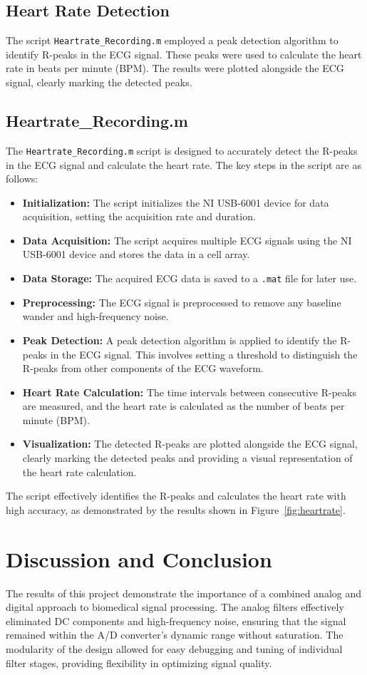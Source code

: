 \documentclass[11pt]{article}
\begin{document}
\subsection{Heart Rate Detection}
The script \texttt{Heartrate\_Recording.m} employed a peak detection algorithm to identify R-peaks in the ECG signal. These
peaks were used to calculate the heart rate in beats per minute (BPM). The results were plotted alongside the ECG signal,
clearly marking the detected peaks.
\subsection{Heartrate\_Recording.m}
The \texttt{Heartrate\_Recording.m} script is designed to accurately detect the R-peaks in the ECG signal and calculate the heart rate. The key steps in the script are as follows:
\begin{itemize}
  \item \textbf{Initialization:} The script initializes the NI USB-6001 device for data acquisition, setting the acquisition rate and duration.
  \item \textbf{Data Acquisition:} The script acquires multiple ECG signals using the NI USB-6001 device and stores the data in a cell array.
  \item \textbf{Data Storage:} The acquired ECG data is saved to a \texttt{.mat} file for later use.
  \item \textbf{Preprocessing:} The ECG signal is preprocessed to remove any baseline wander and high-frequency noise.
  \item \textbf{Peak Detection:} A peak detection algorithm is applied to identify the R-peaks in the ECG signal. This involves setting a threshold to distinguish the R-peaks from other components of the ECG waveform.
  \item \textbf{Heart Rate Calculation:} The time intervals between consecutive R-peaks are measured, and the heart rate is calculated as the number of beats per minute (BPM).
  \item \textbf{Visualization:} The detected R-peaks are plotted alongside the ECG signal, clearly marking the detected peaks and providing a visual representation of the heart rate calculation.
\end{itemize}
The script effectively identifies the R-peaks and calculates the heart rate with high accuracy, as demonstrated by the results shown in Figure~\ref{fig:heartrate}.
\section{Discussion and Conclusion}
The results of this project demonstrate the importance of a combined analog and digital approach to biomedical signal
processing. The analog filters effectively eliminated DC components and high-frequency noise, ensuring that the signal
remained within the A/D converter's dynamic range without saturation. The modularity of the design allowed for easy
debugging and tuning of individual filter stages, providing flexibility in optimizing signal quality.
\end{document}
